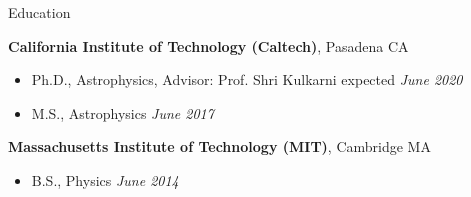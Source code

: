 \documentclass{resume} %
\begin{document}

\begin{rSection}{Education}

{\bf California Institute of Technology (Caltech)}, Pasadena CA
\begin{itemize}
\item Ph.D., Astrophysics, 
  Advisor: Prof. Shri Kulkarni \hfill expected {\em June 2020} 
\end{itemize}

\begin{itemize}
  \item M.S., Astrophysics \hfill {\em June 2017}
\end{itemize}

{\bf Massachusetts Institute of Technology (MIT)}, Cambridge MA
\begin{itemize}
\item B.S., Physics \hfill {\em June 2014} 
\end{itemize}

\end{rSection}




\end{document}
